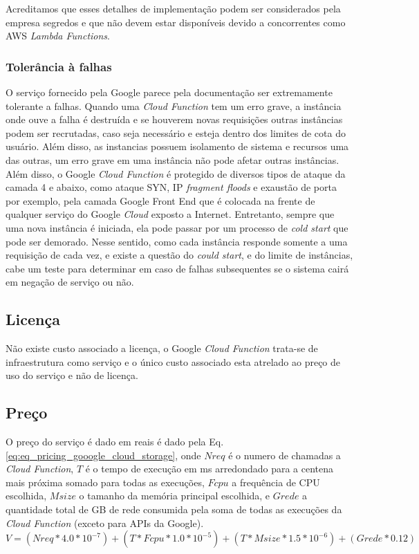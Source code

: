 Acreditamos que esses detalhes de implementação podem ser considerados pela empresa segredos e que não devem estar disponíveis devido a concorrentes como AWS \textit{Lambda Functions}.

\subsubsection{Tolerância à falhas}
O serviço fornecido pela Google parece pela documentação ser extremamente tolerante a falhas. Quando uma \textit{Cloud Function} tem um erro grave, a instância onde ouve a falha é destruída e se houverem novas requisições outras instâncias podem ser recrutadas, caso seja necessário e esteja dentro dos limites de cota do usuário. Além disso, as instancias possuem isolamento de sistema e recursos uma das outras, um erro grave em uma instância não pode afetar outras instâncias. Além disso, o Google \textit{Cloud Function} é protegido de diversos tipos de ataque da camada 4 e abaixo, como ataque SYN, IP \textit{fragment floods} e exaustão de porta por exemplo, pela camada Google Front End que é colocada na frente de qualquer serviço do Google \textit{Cloud} exposto a Internet. Entretanto, sempre que uma nova instância é iniciada, ela pode passar por um processo de \textit{cold start} que pode ser demorado. Nesse sentido, como cada instância responde somente a uma requisição de cada vez, e existe a questão do \textit{could start}, e do limite de instâncias, cabe um teste para determinar em caso de falhas subsequentes se o sistema cairá em negação de serviço ou não.

\subsection{Licença}
Não existe custo associado a licença, o Google \textit{Cloud Function} trata-se de infraestrutura como serviço e o único custo associado esta atrelado ao preço de uso do serviço e não de licença.

\subsection{Preço}
O preço do serviço é dado em reais é dado pela Eq. \eqref{eq:eq_pricing_gooogle_cloud_storage}, onde \(Nreq\) é o numero de chamadas a \textit{Cloud Function}, \(T\) é o tempo de execução em ms arredondado para a centena mais próxima somado para todas as execuções, \(Fcpu\) a frequência de CPU escolhida, \(Msize\) o tamanho da memória principal escolhida, e \(Grede\) a quantidade total de GB de rede consumida pela soma de todas as execuções da \textit{Cloud Function} (exceto para APIs da Google). 
\begin{equation}
	V = (Nreq*4.0*10^{-7})+(T*Fcpu*1.0*10^{-5})+(T*Msize*1.5*10^{-6})+(Grede*0.12)
	\label{eq:eq_pricing_gooogle_cloud_storage}
\end{equation}

